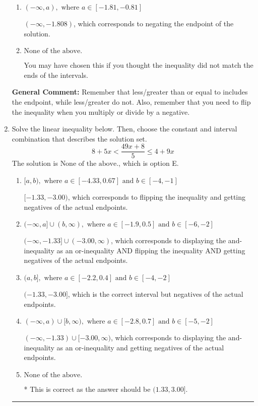\documentclass{extbook}[14pt]
\newcommand{\litem}[1]{\item #1

\rule{\textwidth}{0.4pt}}
\begin{document}
\begin{enumerate}
{\begin{enumerate}[label=\Alph*.]
* $(-\infty, 1.808)$, which is the correct option.
\item \( (-\infty, a), \text{ where } a \in [-1.81, -0.81] \)

 $(-\infty, -1.808)$, which corresponds to negating the endpoint of the solution.
\item \( \text{None of the above}. \)

You may have chosen this if you thought the inequality did not match the ends of the intervals.
\end{enumerate}

\textbf{General Comment:} Remember that less/greater than or equal to includes the endpoint, while less/greater do not. Also, remember that you need to flip the inequality when you multiply or divide by a negative.
}
\litem{
Solve the linear inequality below. Then, choose the constant and interval combination that describes the solution set.
\[ 8 + 5 x < \frac{49 x + 8}{5} \leq 4 + 9 x \]The solution is \( \text{None of the above.} \), which is option E.\begin{enumerate}[label=\Alph*.]
\item \( [a, b), \text{ where } a \in [-4.33, 0.67] \text{ and } b \in [-4, -1] \)

$[-1.33, -3.00)$, which corresponds to flipping the inequality and getting negatives of the actual endpoints.
\item \( (-\infty, a] \cup (b, \infty), \text{ where } a \in [-1.9, 0.5] \text{ and } b \in [-6, -2] \)

$(-\infty, -1.33] \cup (-3.00, \infty)$, which corresponds to displaying the and-inequality as an or-inequality AND flipping the inequality AND getting negatives of the actual endpoints.
\item \( (a, b], \text{ where } a \in [-2.2, 0.4] \text{ and } b \in [-4, -2] \)

$(-1.33, -3.00]$, which is the correct interval but negatives of the actual endpoints.
\item \( (-\infty, a) \cup [b, \infty), \text{ where } a \in [-2.8, 0.7] \text{ and } b \in [-5, -2] \)

$(-\infty, -1.33) \cup [-3.00, \infty)$, which corresponds to displaying the and-inequality as an or-inequality and getting negatives of the actual endpoints.
\item \( \text{None of the above.} \)

* This is correct as the answer should be $(1.33, 3.00]$.
\end{enumerate}

}
\end{enumerate}
\end{document}
